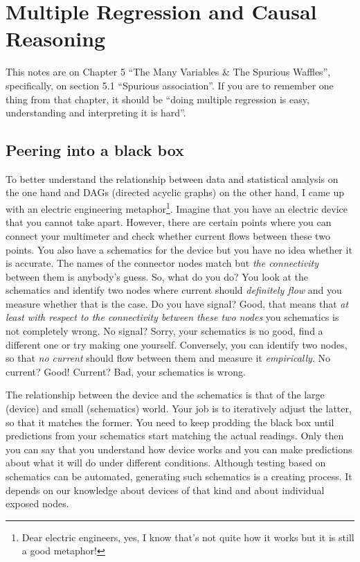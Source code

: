 \documentclass[
]{book}
\begin{document}
\hypertarget{multiple-regression-and-causal-reasoning}{%
\chapter{Multiple Regression and Causal Reasoning}\label{multiple-regression-and-causal-reasoning}}

This notes are on Chapter 5 ``The Many Variables \& The Spurious Waffles'', specifically, on section 5.1 ``Spurious association''. If you are to remember one thing from that chapter, it should be ``doing multiple regression is easy, understanding and interpreting it is hard''.

\hypertarget{peering-into-a-black-box}{%
\section{Peering into a black box}\label{peering-into-a-black-box}}

To better understand the relationship between data and statistical analysis on the one hand and DAGs (directed acyclic graphs) on the other hand, I came up with an electric engineering metaphor\footnote{Dear electric engineers, yes, I know that's not quite how it works but it is still a good metaphor!}. Imagine that you have an electric device that you cannot take apart. However, there are certain points where you can connect your multimeter and check whether current flows between these two points. You also have a schematics for the device but you have no idea whether it is accurate. The names of the connector nodes match but \emph{the connectivity} between them is anybody's guess. So, what do you do? You look at the schematics and identify two nodes where current should \emph{definitely flow} and you measure whether that is the case. Do you have signal? Good, that means that \emph{at least with respect to the connectivity between these two nodes} you schematics is not completely wrong. No signal? Sorry, your schematics is no good, find a different one or try making one yourself. Conversely, you can identify two nodes, so that \emph{no current} should flow between them and measure it \emph{empirically}. No current? Good! Current? Bad, your schematics is wrong.

The relationship between the device and the schematics is that of the large (device) and small (schematics) world. Your job is to iteratively adjust the latter, so that it matches the former. You need to keep prodding the black box until predictions from your schematics start matching the actual readings. Only then you can say that you understand how device works and you can make predictions about what it will do under different conditions. Although testing based on schematics can be automated, generating such schematics is a creating process. It depends on our knowledge about devices of that kind and about individual exposed nodes.
\end{document}
